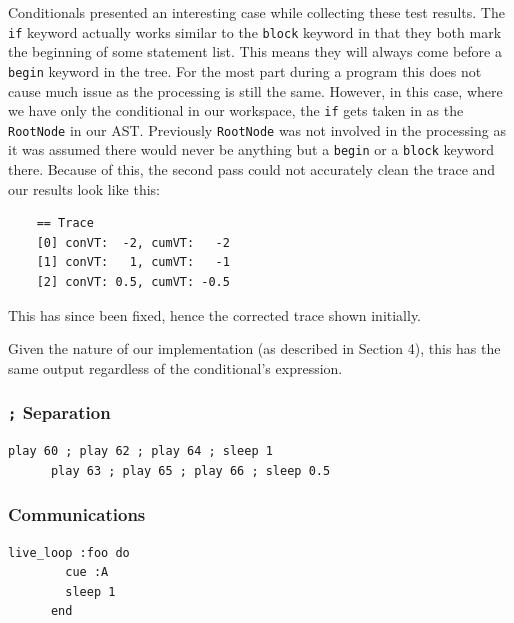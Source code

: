 \documentclass[11pt, abstracton, twoside, titlepage=true]{scrartcl}
\begin{document}
Conditionals presented an interesting case while collecting these test results. The
\texttt{if} keyword actually works similar to the \texttt{block} keyword in that 
they both mark the beginning of some statement list. This means they will always 
come before a \texttt{begin} keyword in the tree. For the most part during a program 
this does not cause much issue as the processing is still the same. However, in 
this case, where we have only the conditional in our workspace, the \texttt{if} gets 
taken in as the \texttt{RootNode} in our AST. Previously \texttt{RootNode} was 
not involved in the processing as it was assumed there would never be anything but 
a \texttt{begin} or a \texttt{block} keyword there. Because of this, the second 
pass could not accurately clean the trace and our results look like this:
\\
\begin{lstlisting}
    == Trace
    [0] conVT:  -2, cumVT:   -2
    [1] conVT:   1, cumVT:   -1
    [2] conVT: 0.5, cumVT: -0.5
\end{lstlisting}

This has since been fixed, hence the corrected trace shown initially.

Given the nature of our implementation (as described in Section 4), this has the
same output regardless of the conditional's expression.

\subsubsection{\texttt{;} Separation}
\begin{minipage}{\textwidth}
	\begin{lstlisting}[style = sonicpi]
      play 60 ; play 62 ; play 64 ; sleep 1
      play 63 ; play 65 ; play 66 ; sleep 0.5
	\end{lstlisting}
\end{minipage}

\subsubsection{Communications}
\begin{minipage}{\textwidth}
	\begin{lstlisting}[style = sonicpi]
      live_loop :foo do
        cue :A
        sleep 1
      end
	\end{lstlisting}
\end{minipage}
\end{document}

